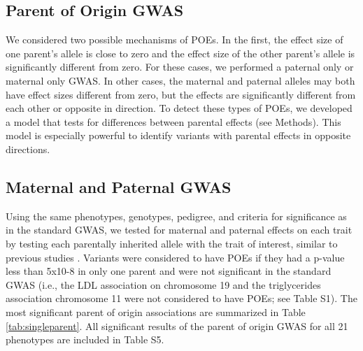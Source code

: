 \subsection{Parent of Origin GWAS}\label{Parent of Origin GWAS}
We considered two possible mechanisms of POEs. In the first, the effect size of one parent's allele is close to zero and the effect size of the other parent's allele is significantly different from zero. For these cases, we performed a paternal only or maternal only GWAS. In other cases, the maternal and paternal alleles may both have effect sizes different from zero, but the effects are significantly different from each other or opposite in direction. To detect these types of POEs, we developed a model that tests for differences between parental effects (see Methods). This model is especially powerful to identify variants with parental effects in opposite directions.

\subsection{Maternal and Paternal GWAS}\label{Maternal and Paternal GWAS}
Using the same phenotypes, genotypes, pedigree, and criteria for significance as in the standard GWAS, we tested for maternal and paternal effects on each trait by testing each parentally inherited allele with the trait of interest, similar to previous studies \citep{Kong:2009kk,Zoledziewska:2015do,Garg2012a}. Variants were considered to have POEs if they had a p-value less than 5x10-8 in only one parent and were not significant in the standard GWAS (i.e., the LDL association on chromosome 19 and the triglycerides association chromosome 11 were not considered to have POEs; see Table S1). The most significant parent of origin associations are summarized in Table \ref{tab:singleparent}. All significant results of the parent of origin GWAS for all 21 phenotypes are included in Table S5. 


